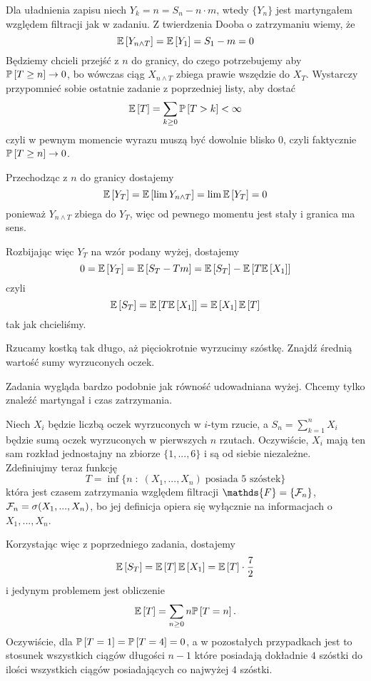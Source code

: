 \begin{solution}
  Dla uładnienia zapisu niech $Y_k=n=S_n-n\cdot m$, wtedy $\{Y_n\}$ jest martyngałem względem filtracji jak w zadaniu. 
  Z twierdzenia Dooba o zatrzymaniu wiemy, że
  $$\expected{Y_{n\land T}}=\expected{Y_1}=S_1-m=0$$
  Będziemy chcieli przejść z $n$ do granicy, do czego potrzebujemy aby $\prob{T\geq n}\to 0$, bo wówczas ciąg $X_{n\land T}$ zbiega prawie wszędzie do $X_T$. Wystarczy przypomnieć sobie ostatnie zadanie z poprzedniej listy, aby dostać
  $$\expected{T}=\sum_{k\geq 0}\prob{T>k}<\infty$$
  czyli w pewnym momencie wyrazu muszą być dowolnie blisko $0$, czyli faktycznie $\prob{T\geq n}\to 0$.

  Przechodząc z $n$ do granicy dostajemy
  $$\expected{Y_T}=\expected{\lim Y_{n\land T}}=\lim\expected{Y_T}=0$$
  ponieważ $Y_{n\land T}$ zbiega do $Y_T$, więc od pewnego momentu jest stały i granica ma sens.

  Rozbijając więc $Y_T$ na wzór podany wyżej, dostajemy
  $$0=\expected{Y_T}=\expected{S_T-Tm}=\expected{S_T}-\expected{T\expected{X_1}}$$
  czyli
  $$\expected{S_T}=\expected{T\expected{X_1}}=\expected{X_1}\expected{T}$$
  tak jak chcieliśmy.
\end{solution}

\begin{problem}
  Rzucamy kostką tak długo, aż pięciokrotnie wyrzucimy szóstkę. Znajdź średnią wartość sumy wyrzuconych oczek.
\end{problem}

\begin{solution}
  Zadania wygląda bardzo podobnie jak równość udowadniana wyżej. Chcemy tylko znaleźć martyngał i czas zatrzymania.

  Niech $X_i$ będzie liczbą oczek wyrzuconych w $i$-tym rzucie, a $S_n=\sum_{k=1}^nX_i$ będzie sumą oczek wyrzuconych w pierwszych $n$ rzutach. Oczywiście, $X_i$ mają ten sam rozkład jednostajny na zbiorze $\{1,...,6\}$ i są od siebie niezależne. Zdefiniujmy teraz funkcję
  $$T=\inf \{n\;:\;(X_1,...,X_n)\;\text{posiada 5 szóstek}\}$$
  która jest czasem zatrzymania względem filtracji $\mathds{F}=\{\set{F}_n\}$, $\mathcal{F}_n=\sigma(X_1,...,X_n)$, bo jej definicja opiera się wyłącznie na informacjach o $X_1,...,X_n$.

  Korzystając więc z poprzedniego zadania, dostajemy
  $$\expected{S_T}=\expected{T}\expected{X_1}=\expected{T}\cdot\frac{7}{2}$$
  i jedynym problemem jest obliczenie 
  $$\expected{T}=\sum_{n\geq0}n\prob{T=n}.$$
  Oczywiście, dla $\prob{T=1}=\prob{T=4}=0$, a w pozostałych przypadkach jest to stosunek wszystkich ciągów długości $n-1$ które posiadają dokładnie $4$ szóstki do ilości wszystkich ciągów posiadających co najwyżej $4$ szóstki.
\end{solution}

